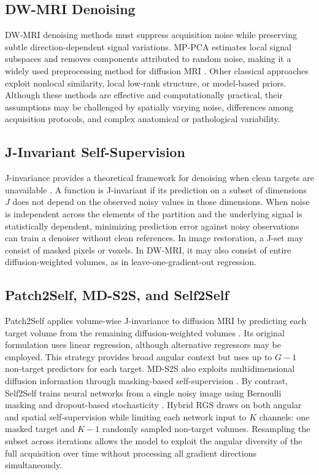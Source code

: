 \documentclass[preprint,12pt]{elsarticle}
\begin{document}
\subsection{DW-MRI Denoising}
DW-MRI denoising methods must suppress acquisition noise while preserving subtle direction-dependent signal variations. MP-PCA estimates local signal subspaces and removes components attributed to random noise, making it a widely used preprocessing method for diffusion MRI \cite{veraart2016mppca}. Other classical approaches exploit nonlocal similarity, local low-rank structure, or model-based priors. Although these methods are effective and computationally practical, their assumptions may be challenged by spatially varying noise, differences among acquisition protocols, and complex anatomical or pathological variability.

\subsection{J-Invariant Self-Supervision}
J-invariance provides a theoretical framework for denoising when clean targets are unavailable \cite{jinvariance}. A function is J-invariant if its prediction on a subset of dimensions $J$ does not depend on the observed noisy values in those dimensions. When noise is independent across the elements of the partition and the underlying signal is statistically dependent, minimizing prediction error against noisy observations can train a denoiser without clean references. In image restoration, a J-set may consist of masked pixels or voxels. In DW-MRI, it may also consist of entire diffusion-weighted volumes, as in leave-one-gradient-out regression.

\subsection{Patch2Self, MD-S2S, and Self2Self}
Patch2Self applies volume-wise J-invariance to diffusion MRI by predicting each target volume from the remaining diffusion-weighted volumes \cite{fadnavis2020patch2self}. Its original formulation uses linear regression, although alternative regressors may be employed. This strategy provides broad angular context but uses up to $G-1$ non-target predictors for each target. MD-S2S also exploits multidimensional diffusion information through masking-based self-supervision \cite{kang2024mds2s}. By contrast, Self2Self trains neural networks from a single noisy image using Bernoulli masking and dropout-based stochasticity \cite{self2self}. Hybrid RGS draws on both angular and spatial self-supervision while limiting each network input to $K$ channels: one masked target and $K-1$ randomly sampled non-target volumes. Resampling the subset across iterations allows the model to exploit the angular diversity of the full acquisition over time without processing all gradient directions simultaneously.
\end{document}
